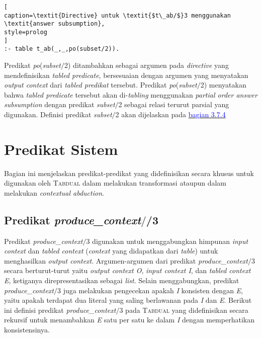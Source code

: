 \begin{lstlisting}[
caption=\textit{Directive} untuk \textit{$t\_ab/$}3 menggunakan \textit{answer subsumption},
style=prolog
]
:- table t_ab(_,_,po(subset/2)).
\end{lstlisting}

Predikat \textit{po}(\textit{subset$/$}2) ditambahkan sebagai argumen pada \textit{directive} yang mendefinisikan \textit{tabled predicate}, bersesuaian dengan argumen yang menyatakan \textit{output context} dari \textit{tabled predikat} tersebut. Predikat \textit{po}(\textit{subset$/$}2) menyatakan bahwa \textit{tabled predicate} tersebut akan di-\textit{tabling} menggunakan \textit{partial order answer subsumption} dengan predikat \textit{subset$/$}2 sebagai relasi terurut parsial yang digunakan. Definisi predikat \textit{subset$/$}2 akan dijelaskan pada \hyperref[subset]{\textcolor{blue}{bagian 3.7.4}}

\section{Predikat Sistem}

Bagian ini menjelaskan predikat-predikat yang didefinisikan secara khusus untuk digunakan oleh \textsc{Tabdual} dalam melakukan transformasi ataupun dalam melakukan \textit{contextual abduction}.

\subsection{Predikat \textit{produce\_context$/$}/3}

Predikat \textit{produce\_context$/$}3 digunakan untuk menggabungkan himpunan \textit{input context} dan \textit{tabled context} (\textit{context} yang didapatkan dari \textit{table}) untuk menghasilkan \textit{output context}. Argumen-argumen dari predikat \textit{produce\_context$/$}3 secara berturut-turut yaitu \textit{output context O}, \textit{input context I}, dan \textit{tabled context E}, ketiganya direpresentasikan sebagai \textit{list}. Selain menggabungkan, predikat \textit{produce\_context$/$}3 juga melakukan pengecekan apakah \textit{I} konsisten dengan \textit{E}, yaitu apakah terdapat dua literal yang saling berlawanan pada \textit{I} dan \textit{E}. Berikut ini definisi predikat \textit{produce\_context$/$}3 pada \textsc{Tabdual} yang didefinisikan secara rekursif untuk menambahkan \textit{E} satu per satu ke dalam \textit{I} dengan memperhatikan konsistensinya.
\\


